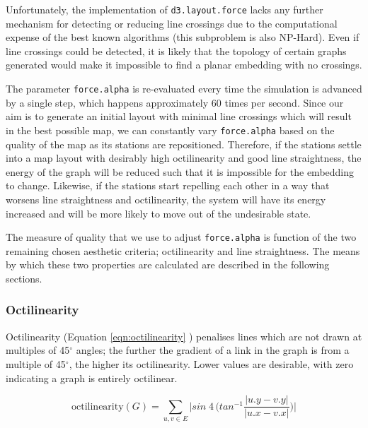 Unfortunately, the implementation of \texttt{d3.layout.force} lacks any further mechanism for detecting or reducing line crossings due to the computational expense of the best known algorithms (this subproblem is also NP-Hard). Even if line crossings could be detected, it is likely that the topology of certain graphs generated would make it impossible to find a planar embedding with no crossings.

The parameter \texttt{force.alpha} is re-evaluated every time the simulation is advanced by a single step, which happens approximately 60 times per second. Since our aim is to generate an initial layout with minimal line crossings which will result in the best possible map, we can constantly vary \texttt{force.alpha} based on the quality of the map as its stations are repositioned. Therefore, if the stations settle into a map layout with desirably high octilinearity and good line straightness, the energy of the graph will be reduced such that it is impossible for the embedding to change. Likewise, if the stations start repelling each other in a way that worsens line straightness and octilinearity, the system will have its energy increased and will be more likely to move out of the undesirable state.

The measure of quality that we use to adjust \texttt{force.alpha} is function of the two remaining chosen aesthetic criteria; octilinearity and line straightness. The means by which these two properties are calculated are described in the following sections.

\subsubsection{Octilinearity}

Octilinearity (Equation \ref{eqn:octilinearity} \citep{AutomaticMetroMapLayoutThesis}) penalises lines which are not drawn at multiples of 45$^{\circ}$ angles; the further the gradient of a link in the graph is from a multiple of 45$^{\circ}$, the higher its octilinearity. Lower values are desirable, with zero indicating a graph is entirely octilinear. 

\begin{equation}
	\text{octilinearity}(G) = \sum_{u, v\in E}\bigg|sin\;4\,\bigg(tan^{-1}\frac{|u.y - v.y|}{|u.x - v.x|}\bigg)\bigg|
\label{eqn:octilinearity}
\end{equation}

